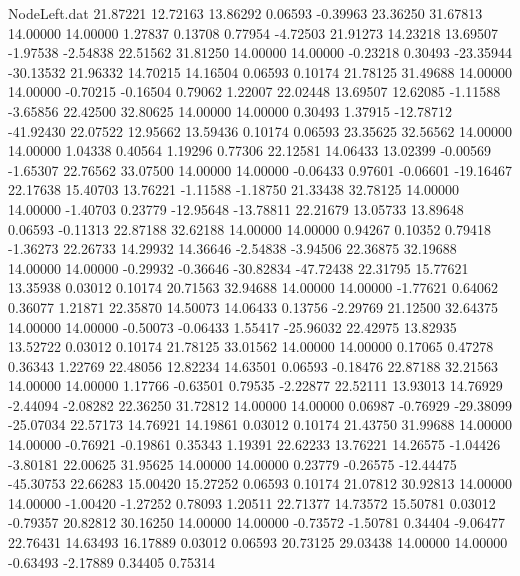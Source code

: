 \begin{filecontents}{NodeLeft.dat}
  21.87221   12.72163   13.86292     0.06593   -0.39963   23.36250   31.67813   14.00000   14.00000    1.27837    0.13708    0.77954   -4.72503
  21.91273   14.23218   13.69507    -1.97538   -2.54838   22.51562   31.81250   14.00000   14.00000   -0.23218    0.30493  -23.35944  -30.13532
  21.96332   14.70215   14.16504     0.06593    0.10174   21.78125   31.49688   14.00000   14.00000   -0.70215   -0.16504    0.79062    1.22007
  22.02448   13.69507   12.62085    -1.11588   -3.65856   22.42500   32.80625   14.00000   14.00000    0.30493    1.37915  -12.78712  -41.92430
  22.07522   12.95662   13.59436     0.10174    0.06593   23.35625   32.56562   14.00000   14.00000    1.04338    0.40564    1.19296    0.77306
  22.12581   14.06433   13.02399    -0.00569   -1.65307   22.76562   33.07500   14.00000   14.00000   -0.06433    0.97601   -0.06601  -19.16467
  22.17638   15.40703   13.76221    -1.11588   -1.18750   21.33438   32.78125   14.00000   14.00000   -1.40703    0.23779  -12.95648  -13.78811
  22.21679   13.05733   13.89648     0.06593   -0.11313   22.87188   32.62188   14.00000   14.00000    0.94267    0.10352    0.79418   -1.36273
  22.26733   14.29932   14.36646    -2.54838   -3.94506   22.36875   32.19688   14.00000   14.00000   -0.29932   -0.36646  -30.82834  -47.72438
  22.31795   15.77621   13.35938     0.03012    0.10174   20.71563   32.94688   14.00000   14.00000   -1.77621    0.64062    0.36077    1.21871
  22.35870   14.50073   14.06433     0.13756   -2.29769   21.12500   32.64375   14.00000   14.00000   -0.50073   -0.06433    1.55417  -25.96032
  22.42975   13.82935   13.52722     0.03012    0.10174   21.78125   33.01562   14.00000   14.00000    0.17065    0.47278    0.36343    1.22769
  22.48056   12.82234   14.63501     0.06593   -0.18476   22.87188   32.21563   14.00000   14.00000    1.17766   -0.63501    0.79535   -2.22877
  22.52111   13.93013   14.76929    -2.44094   -2.08282   22.36250   31.72812   14.00000   14.00000    0.06987   -0.76929  -29.38099  -25.07034
  22.57173   14.76921   14.19861     0.03012    0.10174   21.43750   31.99688   14.00000   14.00000   -0.76921   -0.19861    0.35343    1.19391
  22.62233   13.76221   14.26575    -1.04426   -3.80181   22.00625   31.95625   14.00000   14.00000    0.23779   -0.26575  -12.44475  -45.30753
  22.66283   15.00420   15.27252     0.06593    0.10174   21.07812   30.92813   14.00000   14.00000   -1.00420   -1.27252    0.78093    1.20511
  22.71377   14.73572   15.50781     0.03012   -0.79357   20.82812   30.16250   14.00000   14.00000   -0.73572   -1.50781    0.34404   -9.06477
  22.76431   14.63493   16.17889     0.03012    0.06593   20.73125   29.03438   14.00000   14.00000   -0.63493   -2.17889    0.34405    0.75314

\end{filecontents}
